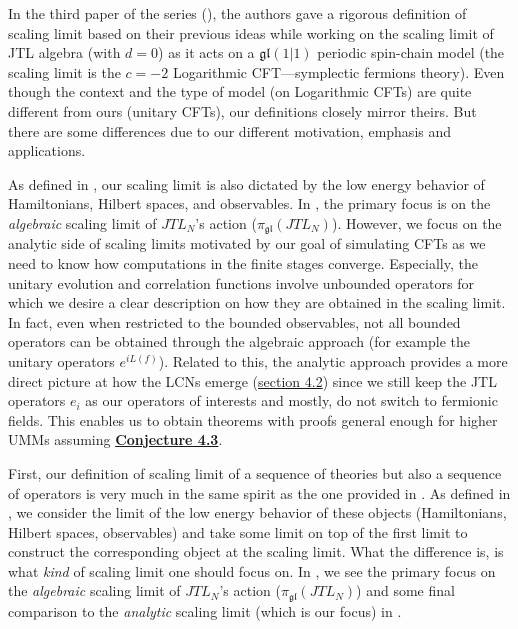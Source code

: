 \documentclass[twoside,11pt,titlepage]{amsart}
\renewcommand{\=}[1]{\stackrel{#1}{=}} %
\theoremstyle{definition}
\theoremstyle{remark}
\begin{document}
In the third paper of the series (\cite{gainutdinov2016associative}), the authors gave a rigorous definition of scaling limit based on their previous ideas while working on the scaling limit of JTL algebra (with $d=0$) as it acts on a $\mathfrak{gl}(1|1)$ periodic spin-chain model (the scaling limit is the $c=-2$ Logarithmic CFT---symplectic fermions theory).  Even though the context and the type of model (on Logarithmic CFTs) are quite different from ours (unitary CFTs), our definitions closely mirror theirs.  But there are some differences due to our different motivation, emphasis and applications.

As defined in \cite[Appendix C]{gainutdinov2016associative}, our scaling limit is also dictated by the low energy behavior of Hamiltonians, Hilbert spaces, and observables.  In \cite{gainutdinov2016associative}, the primary focus is on the \textit{algebraic} scaling limit of $JTL_N$'s action ($\pi_{\mathfrak{gl}}(JTL_N)$). However, we focus on the analytic side of scaling limits motivated by our goal of simulating CFTs as we need to know how computations in the finite stages converge. Especially, the unitary evolution and correlation functions involve unbounded operators for which we desire a clear description on how they are obtained in the scaling limit. In fact, even when restricted to the bounded observables, not all bounded operators can be obtained through the algebraic approach (for example the unitary operators $e^{iL(f)}$). Related to this, the analytic approach provides a more direct picture at how the LCNs emerge (\hyperref[4.2]{section 4.2}) since we still keep the JTL operators $e_i$ as our operators of interests and mostly, do not switch to fermionic fields. This enables us to obtain theorems with proofs general enough for higher UMMs assuming \hyperref[cnj4.3]{\textbf{Conjecture 4.3}}.


\iffalse
First, our definition of scaling limit of a sequence of theories but also a sequence of operators is very much in the same spirit as the one provided in \cite{gainutdinov2016associative}. As defined in \cite[Appendix C]{gainutdinov2016associative}, we consider the limit of the low energy behavior of these objects (Hamiltonians, Hilbert spaces, observables) and take some limit on top of the first limit to construct the corresponding object at the scaling limit. What the difference is, is what \textit{kind} of scaling limit one should focus on. In \cite{gainutdinov2016associative}, we see the primary focus on the \textit{algebraic} scaling limit of $JTL_N$'s action ($\pi_{\mathfrak{gl}}(JTL_N)$) and some final comparison to the \textit{analytic} scaling limit (which is our focus) in \cite[section 6]{gainutdinov2016associative}.
\end{document}
